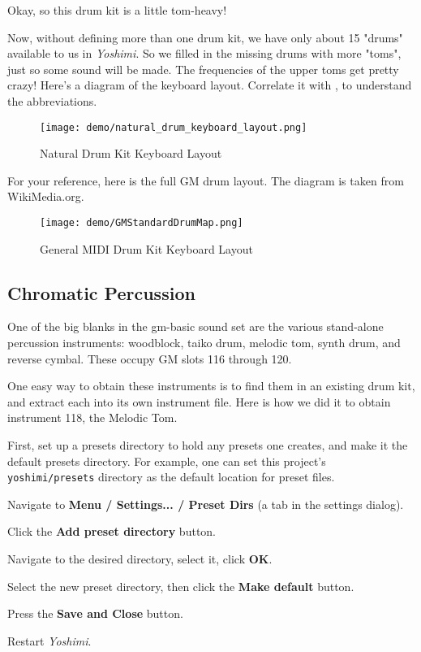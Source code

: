    Okay, so this drum kit is a little tom-heavy!

   Now, without defining more than one drum kit, we have only about 15
   "drums" available to us in \textsl{Yoshimi}.  So we filled in the missing
   drums with more "toms", just so some sound will be made.  The frequencies
   of the upper toms get pretty crazy!  Here's a diagram of the keyboard
   layout.  Correlate it with
   , to understand the
   abbreviations.

\begin{figure}[H]
   \centering 
   \texttt{[image: demo/natural\_drum\_keyboard\_layout.png]}
   \caption{Natural Drum Kit Keyboard Layout}
   \label{fig:cookbook_bank_natural_drum_kit_layout}
\end{figure}

   For your reference, here is the full GM drum layout.  The diagram is
   taken from WikiMedia.org.

\begin{figure}[H]
   \centering 
   \texttt{[image: demo/GMStandardDrumMap.png]}
   \caption{General MIDI Drum Kit Keyboard Layout}
   \label{fig:cookbook_bank_general_drum_kit_layout}
\end{figure}

\subsection{Chromatic Percussion}
\label{subsec:cookbook_instruments_chromperc}

   One of the big blanks in the gm-basic sound set are the various
   stand-alone percussion instruments:
   woodblock, taiko drum, melodic tom, synth drum, and reverse cymbal.
   These occupy GM slots 116 through 120.

   One easy way to obtain these instruments is to find them in an existing
   drum kit, and extract each into its own instrument file.  Here is how we
   did it to obtain instrument 118, the Melodic Tom.

   First, set up a presets directory to hold any presets one creates, and
   make it the default presets directory.  For example, one can
   set this project's \texttt{yoshimi/presets} directory as the default
   location for preset files.

      \begin{enumber}
         \item Navigate to \textbf{Menu / Settings... / Preset Dirs}
            (a tab in the settings dialog).
         \item Click the \textbf{Add preset directory} button.
         \item Navigate to the desired directory, select it, click
            \textbf{OK}.
         \item Select the new preset directory, then click the
            \textbf{Make default} button.
         \item Press the \textbf{Save and Close} button.
         \item Restart \textsl{Yoshimi}.
      \end{enumber}


